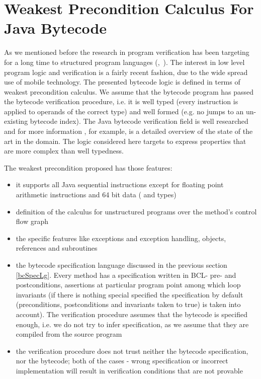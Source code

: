 
\section{Weakest Precondition Calculus For Java Bytecode}\label{wpbc}
As we mentioned before the research in program verification has been targeting for a long time to structured program languages (\cite{WPCDS},~\cite{DisDij}). 
The interest in low level program logic and verification is a fairly recent fashion, due to the wide spread use of mobile technology.
The presented bytecode logic is defined in terms of weakest precondition calculus. We assume 
that the bytecode program has passed the bytecode verification procedure, i.e. it is well typed 
(every instruction is applied to operands of the correct type) and well formed 
(e.g. no jumps to an un-existing bytecode index). The Java bytecode verification field is  well researched and 
for more information \cite{Ljbc}, for example, is a detailed overview of the state of the art in the domain. 
The logic considered here targets to express properties that are more complex than well typedness.

The weakest precondition proposed has those features:
\begin{itemize}
\item it supports all Java sequential instructions except for floating point arithmetic instructions and 64 bit data ( and  types)
\item definition of the calculus for unstructured programs over the method's control flow graph
\item the specific features like exceptions and exception handling, objects, references and subroutines
\item the bytecode specification language discussed in the previous section \ref{bcSpecLg}. Every method has a specification written 
in BCL- pre- and postconditions, assertions at particular program point among 
which loop invariants (if there is nothing special specified the specification by default (preconditions, postconditions and invariants taken to true) is taken into account). The verification procedure assumes that the bytecode is specified enough, i.e. we do not try to infer specification, as we assume that they are compiled from the source program
\item the verification procedure does not trust neither the bytecode specification, nor the bytecode; both of the cases - wrong 
specification or incorrect implementation will result in verification conditions that are not provable 
\end{itemize}


